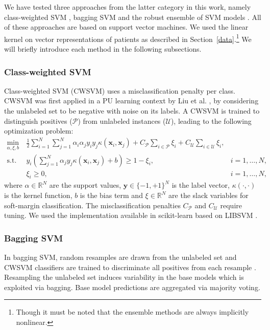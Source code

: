 We have tested three approaches from the latter category in this work, namely class-weighted SVM \citep{Liu:2003:BTC:951949.952139}, bagging SVM \citep{MORDELET-2010-523336} and the robust ensemble of SVM models \citep{Claesen2015resvm}. All of these approaches are based on support vector machines. We used the linear kernel on vector representations of patients as described in Section~\ref{data}.\footnote{Though it must be noted that the ensemble methods are always implicitly nonlinear.} We will briefly introduce each method in the following subsections.

\subsubsection{Class-weighted SVM} \label{bsvm}
Class-weighted SVM (CWSVM) uses a misclassification penalty per class. CWSVM was first applied in a PU learning context by Liu et al. \citep{Liu:2003:BTC:951949.952139}, by considering the unlabeled set to be negative with noise on its labels. A CWSVM is trained to distinguish positives ($\mathcal{P}$) from unlabeled instances ($\mathcal{U}$), leading to the following optimization problem:
\begin{align}
\min_{\alpha,\xi,b}\ & \frac{1}{2}\sum_{i=1}^N\sum_{j=1}^N \alpha_i\alpha_j y_i y_j \kappa(\mathbf{x}_i,\mathbf{x}_j)+C_{\mathcal{P}}\sum_{i \in\mathcal{P}} \xi_i + C_{\mathcal{U}}\sum_{i\in\mathcal{U}} \xi_i, \label{eq:bsvm} \\
\text{s.t. } &y_i(\sum_{j=1}^N \alpha_j y_j \kappa(\mathbf{x}_i,\mathbf{x}_j)+b)\geq 1-\xi_i, &i=1,\ldots,N, \nonumber \\
&\xi_i \geq 0, &i=1,\ldots,N, \nonumber
\end{align}
where $\alpha \in \mathbb{R}^N$ are the support values, $\mathbf{y} \in \{-1,+1\}^N$ is the label vector, $\kappa(\cdot,\cdot)$ is the kernel function, $b$ is the bias term and $\xi \in \mathbb{R}^N$ are the slack variables for soft-margin classification. The misclassification penalties $C_{\mathcal{P}}$ and $C_{\mathcal{U}}$ require tuning. We used the implementation available in scikit-learn \citep{pedregosa2011scikit} based on LIBSVM \citep{CC01a}.

\subsubsection{Bagging SVM} \label{baggingsvm}
In bagging SVM, random resamples are drawn from the unlabeled set and CWSVM classifiers are trained to discriminate all positives from each resample \citep{MORDELET-2010-523336}. Resampling the unlabeled set induces variability in the base models which is exploited via bagging. Base model predictions are aggregated via majority voting.

